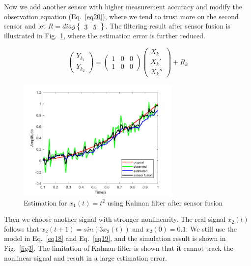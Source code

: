 \documentclass[conference]{IEEEtran}
\begin{document}
	Now we add another sensor with higher measurement accuracy and modify the observation equation (Eq.~\ref{eq20}), where we tend to trust more on the second sensor and let $R=diag\begin{Bmatrix}
	3 &5
	\end{Bmatrix}$. The filtering result after sensor fusion is illustrated in Fig.~\ref{fig2}, where the estimation error is further reduced.
	
	\begin{equation}
	\begin{pmatrix}
	Y_{k_{1}}\\ 
	Y_{k_{2}}
	\end{pmatrix}=\begin{pmatrix}
	1 &0  &0 \\ 
	1 &0  & 0
	\end{pmatrix}\begin{pmatrix}
	X_{k}\\ 
	{X_{k}}'\\ 
	{X_{k}}''
	\end{pmatrix}+R_{k}
	\label{eq20}
	\end{equation}
	
	
	\begin{figure}[H]
		\centering
		\includegraphics[width=8cm]{fig2.png}
		\caption{Estimation for $x_{1}(t)=t^{2}$ using Kalman filter after sensor fusion}
		\label{fig2}
	\end{figure}

	Then we choose another signal with stronger nonlinearity. The real signal $x_{2}(t)$ follows that  $x_{2}(t+1)=sin(3x_{2}(t))$ and $x_{2}(0)=0.1$. We still use the model in Eq.~\ref{eq18} and Eq.~\ref{eq19}, and the simulation result is shown in Fig.~\ref{fig3}. The limitation of Kalman filter is shown that it cannot track the nonlinear signal and result in a large estimation error.
	
\end{document}
